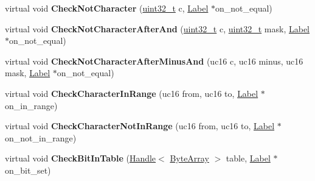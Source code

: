 \begin{DoxyCompactItemize}
\item 
\mbox{\label{classv8_1_1internal_1_1RegExpMacroAssemblerMIPS_af2c6643d958982b07b49338a10e0f07c}} 
virtual void {\bfseries Check\+Not\+Character} (\mbox{\hyperlink{classuint32__t}{uint32\+\_\+t}} c, \mbox{\hyperlink{classv8_1_1internal_1_1Label}{Label}} $\ast$on\+\_\+not\+\_\+equal)
\item 
\mbox{\label{classv8_1_1internal_1_1RegExpMacroAssemblerMIPS_a672b956cbe01255fa2996705b9bedb53}} 
virtual void {\bfseries Check\+Not\+Character\+After\+And} (\mbox{\hyperlink{classuint32__t}{uint32\+\_\+t}} c, \mbox{\hyperlink{classuint32__t}{uint32\+\_\+t}} mask, \mbox{\hyperlink{classv8_1_1internal_1_1Label}{Label}} $\ast$on\+\_\+not\+\_\+equal)
\item 
\mbox{\label{classv8_1_1internal_1_1RegExpMacroAssemblerMIPS_a09f76a20823593559fb72f4ce3e556d9}} 
virtual void {\bfseries Check\+Not\+Character\+After\+Minus\+And} (uc16 c, uc16 minus, uc16 mask, \mbox{\hyperlink{classv8_1_1internal_1_1Label}{Label}} $\ast$on\+\_\+not\+\_\+equal)
\item 
\mbox{\label{classv8_1_1internal_1_1RegExpMacroAssemblerMIPS_a233eb5196a3ef4cfc2c67770f5ebba4f}} 
virtual void {\bfseries Check\+Character\+In\+Range} (uc16 from, uc16 to, \mbox{\hyperlink{classv8_1_1internal_1_1Label}{Label}} $\ast$on\+\_\+in\+\_\+range)
\item 
\mbox{\label{classv8_1_1internal_1_1RegExpMacroAssemblerMIPS_a520e3c053e1715797a8d4602b34b1d4d}} 
virtual void {\bfseries Check\+Character\+Not\+In\+Range} (uc16 from, uc16 to, \mbox{\hyperlink{classv8_1_1internal_1_1Label}{Label}} $\ast$on\+\_\+not\+\_\+in\+\_\+range)
\item 
\mbox{\label{classv8_1_1internal_1_1RegExpMacroAssemblerMIPS_a4429f096364b74b5f1c27576aa7fa4ae}} 
virtual void {\bfseries Check\+Bit\+In\+Table} (\mbox{\hyperlink{classv8_1_1internal_1_1Handle}{Handle}}$<$ \mbox{\hyperlink{classv8_1_1internal_1_1ByteArray}{Byte\+Array}} $>$ table, \mbox{\hyperlink{classv8_1_1internal_1_1Label}{Label}} $\ast$on\+\_\+bit\+\_\+set)

\end{DoxyCompactItemize}
